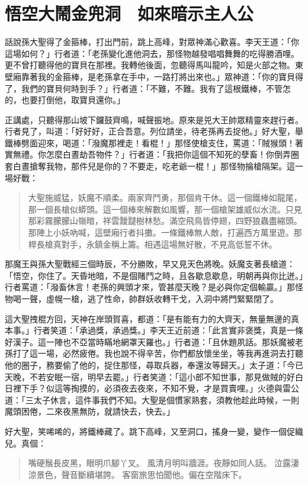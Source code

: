 
\chapter{悟空大鬧金兜洞　如來暗示主人公}

話說孫大聖得了金箍棒，打出門前，跳上高峰，對眾神滿心歡喜。李天王道：「你這場如何？」行者道：「老孫變化進他洞去，那怪物越發唱唱舞舞的吃得勝酒哩。更不曾打聽得他的寶貝在那裡。我轉他後面，忽聽得馬叫龍吟，知是火部之物。東壁廂靠著我的金箍棒，是老孫拿在手中，一路打將出來也。」眾神道：「你的寶貝得了，我們的寶貝何時到手？」行者道：「不難，不難。我有了這根鐵棒，不管怎的，也要打倒他，取寶貝還你。」

正講處，只聽得那山坡下鑼鼓齊鳴，喊聲振地。原來是兕大王帥眾精靈來趕行者。行者見了，叫道：「好好好，正合吾意。列位請坐，待老孫再去捉他。」好大聖，舉鐵棒劈面迎來，喝道：「潑魔那裡走！看棍！」那怪使槍支住，罵道：「賊猴頭！著實無禮。你怎麼白晝劫吾物件？」行者道：「我把你這個不知死的孽畜！你倒弄圈套白晝搶奪我物，那件兒是你的？不要走，吃老爺一棍！」那怪物掄槍隔架。這一場好戰：
\begin{quote}
大聖施威猛，妖魔不順柔。兩家齊鬥勇，那個肯干休。這一個鐵棒如龍尾，那一個長槍似蟒頭。這一個棒來解數如風響，那一個槍架雄威似水流。只見那彩霧朦朦山嶺暗，祥雲靉靆樹林愁。滿空飛鳥皆停翅，四野狼蟲盡縮頭。那陣上小妖吶喊，這壁廂行者抖擻。一條鐵棒無人敵，打遍西方萬里遊。那桿長槍真對手，永鎮金稱上籌。相遇這場無好散，不見高低誓不休。
\end{quote}

那魔王與孫大聖戰經三個時辰，不分勝敗，早又見天色將晚。妖魔支著長槍道：「悟空，你住了。天昏地暗，不是個賭鬥之時，且各歇息歇息，明朝再與你比迸。」行者罵道：「潑畜休言！老孫的興頭才來，管甚麼天晚？是必與你定個輸贏。」那怪物喝一聲，虛幌一槍，逃了性命，帥群妖收轉干戈，入洞中將門緊緊閉了。

這大聖拽棍方回，天神在岸頭賀喜，都道：「是有能有力的大齊天，無量無邊的真本事。」行者笑道：「承過獎，承過獎。」李天王近前道：「此言實非褒獎，真是一條好漢子。這一陣也不亞當時瞞地網罩天羅也。」行者道：「且休題夙話。那妖魔被老孫打了這一場，必然疲倦。我也說不得辛苦，你們都放懷坐坐，等我再進洞去打聽他的圈子，務要偷了他的，捉住那怪，尋取兵器，奉還汝等歸天。」太子道：「今已天晚，不若安眠一宿，明早去罷。」行者笑道：「這小郎不知世事，那見做賊的好白日裡下手？似這等掏摸的，必須夜去夜來，不知不覺，才是買賣哩。」火德與雷公道：「三太子休言，這件事我們不知。大聖是個慣家熟套，須教他趁此時候，一則魔頭困倦，二來夜黑無防，就請快去，快去。」

好大聖，笑唏唏的，將鐵棒藏了。跳下高峰，又至洞口，搖身一變，變作一個促織兒。真個：
\begin{quote}
嘴硬鬚長皮黑，眼明爪腳丫叉。
風清月明叫牆涯。夜靜如同人話。
泣露淒涼景色，聲音斷續堪誇。
客窗旅思怕聞他。偏在空階床下。
\end{quote}

